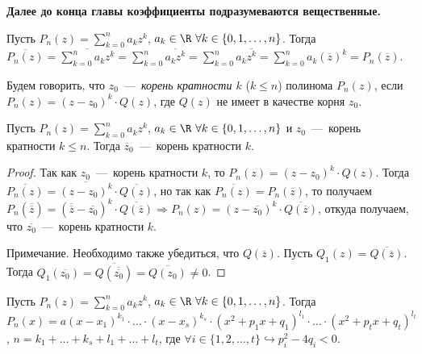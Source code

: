 \textbf{Далее до конца главы коэффициенты подразумеваются вещественные.}
\begin{definition}
    Пусть $\displaystyle P_{n} (z) = \sum_{k = 0}^{n} a_{k} z^{k}$, $a_{k} \in \R \  \forall k \in \{0, 1, \ldots, n \}$. Тогда $\displaystyle \overline{P_{n} (z)} = \overline{\sum_{k = 0}^{n} a_{k} z^{k}} = \sum_{k = 0}^{n} \overline{a_{k} z^{k}} = \sum_{k = 0}^{n} a_{k} \overline{z^{k}} = \sum_{k = 0}^{n} a_{k} (\overline{z})^{k} = P_{n} (\overline{z})$.
\end{definition}
\begin{definition}
    Будем говорить, что $z_{0}$~---~\textit{корень кратности $k$} ($k \leq n$) полинома $P_{n} (z)$, если $P_{n} (z) = (z - z_{0})^{k} \cdot Q (z)$, где $Q (z)$ не имеет в качестве корня $z_{0}$.
\end{definition}
\begin{theorem}
    Пусть $\displaystyle P_{n} (z) = \sum_{k = 0}^{n} a_{k} z^{k}$, $a_{k} \in \R \  \forall k \in \{0, 1, \ldots, n \}$ и $z_{0}$~---~корень кратности $k \leq n$. Тогда $\overline{z}_{0}$~---~корень кратности $k$.
\end{theorem}
\begin{proof}
   Так как $z_{0}$~---~корень кратности $k$, то $P_{n} (z) = (z - z_{0})^{k} \cdot Q (z)$. Тогда $\overline{P_{n} (z)} = \overline{(z - z_{0})^{k}} \cdot \overline{Q (z)}$, но так как $\overline{P_{n} (z)} = P_{n} (\overline{z})$, то получаем $P_{n} (\overline{\overline{z}}) = (\overline{\overline{z}} - \overline{z_{0}})^{k} \cdot \overline{Q (\overline{z})} \Rightarrow P_{n} (z) = (z - \overline{z_{0}})^{k} \cdot \overline{Q (\overline{z})}$, откуда получаем, что $\overline{z_{0}}$~---~корень кратности $k$.

   Примечание. Необходимо также убедиться, что $Q (\overline{z})$. Пусть $Q_{1} (z) = \overline{Q (\overline{z})}$. Тогда $Q_{1} (\overline{z_{0}}) = \overline{Q (\overline{\overline{z_{0}}})} = \overline{Q (z_{0})} \neq 0$.
\end{proof}
\begin{corollary}
    Пусть $\displaystyle P_{n} (z) = \sum_{k = 0}^{n} a_{k} z^{k}$, $a_{k} \in \R \  \forall k \in \{0, 1, \ldots, n \}$. Тогда $P_{n} (x) = a (x - x_{1})^{k_{1}} \cdot \ldots \cdot (x - x_{s})^{k_{s}} \cdot (x^{2} + p_{1} x + q_{1})^{l_{1}} \cdot \ldots \cdot (x^{2} + p_{t} x + q_{t})^{l_{t}}$, $n = k_{1} + \ldots + k_{s} + l_{1} + \ldots + l_{t}$, где $\forall i \in \{ 1, 2, \ldots, t \} \hookrightarrow p^2_{i} - 4 q_{i} < 0$.
\end{corollary}
